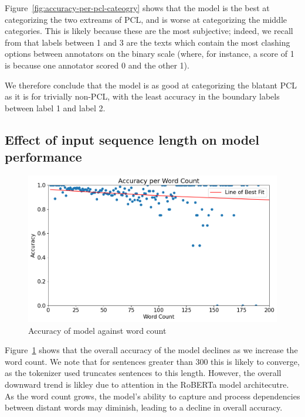 \documentclass[11pt,a4paper]{article}
\begin{document}
Figure~\ref{fig:accuracy-per-pcl-cateogry} shows that the model is the best at categorizing the two extreams of PCL, and is worse at categorizing the middle categories. This is likely because these are the most subjective; indeed, we recall from \citet{perez-almendros-etal-2020-dont} that labels between 1 and 3 are the texts which contain the most clashing options between annotators on the binary scale (where, for instance, a score of 1 is because one annotator scored 0 and the other 1).

We therefore conclude that the model is as good at categorizing the blatant PCL as it is for trivially non-PCL, with the least accuracy in the boundary labels between label 1 and label 2.

\subsection*{Effect of input sequence length on model performance}

\begin{figure}[H]
    \centering
    \includegraphics[width=\linewidth]{figures/accuracy_due_to_word_length.png}
    \caption{Accuracy of model against word count}
    \label{fig:accuracy-word-count}
\end{figure}

Figure~\ref{fig:accuracy-word-count} shows that the overall accuracy of the model declines as we increase the word count. We note that for sentences greater than $300$ this is likely to converge, as the tokenizer used truncates sentences to this length. However, the overall downward trend is likley due to attention in the RoBERTa model architecutre. As the word count grows, the model's ability to capture and process dependencies between distant words may diminish, leading to a decline in overall accuracy.
\end{document}
